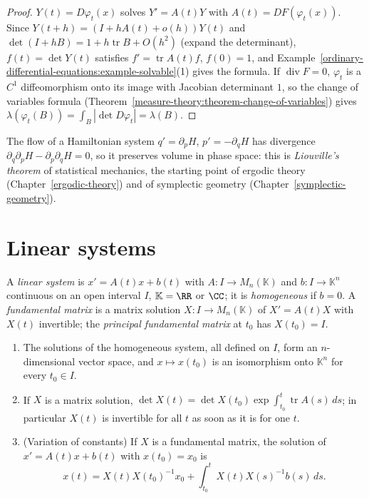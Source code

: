 \begin{proof}
$Y(t) = D\varphi_t(x)$ solves $Y' = A(t)Y$ with $A(t) = DF(\varphi_t(x))$. Since $Y(t + h) = (I + hA(t) + o(h))Y(t)$ and $\det(I + hB) = 1 + h\operatorname{tr}B + O(h^2)$ (expand the determinant), $f(t) = \det Y(t)$
satisfies $f' = \operatorname{tr}A(t)f$, $f(0) = 1$, and Example~\ref{ordinary-differential-equations:example-solvable}(1) gives the formula. If $\operatorname{div}F = 0$, $\varphi_t$ is a $C^1$ diffeomorphism onto its image with
Jacobian determinant $1$, so the change of variables formula (Theorem~\ref{measure-theory:theorem-change-of-variables}) gives $\lambda(\varphi_t(B)) = \int_B|\det D\varphi_t| = \lambda(B)$.
\end{proof}

The flow of a Hamiltonian system $q' = \partial_pH$, $p' = -\partial_qH$ has divergence $\partial_q\partial_pH - \partial_p\partial_qH = 0$, so it preserves volume in phase space: this is \emph{Liouville's theorem} of statistical mechanics,
the starting point of ergodic theory (Chapter~\ref{ergodic-theory}) and of symplectic geometry (Chapter~\ref{symplectic-geometry}).

\section{Linear systems}\label{ordinary-differential-equations:section-linear}

\begin{definition}\label{ordinary-differential-equations:definition-linear}
A \emph{linear system} is $x' = A(t)x + b(t)$ with $A \colon I \to M_n(\mathbb{K})$ and $b \colon I \to \mathbb{K}^n$ continuous on an open interval $I$, $\mathbb{K} = \RR$ or $\CC$; it is \emph{homogeneous} if $b = 0$. A
\emph{fundamental matrix} is a matrix solution $X \colon I \to M_n(\mathbb{K})$ of $X' = A(t)X$ with $X(t)$ invertible; the \emph{principal fundamental matrix} at $t_0$ has $X(t_0) = I$.
\end{definition}

\begin{proposition}\label{ordinary-differential-equations:proposition-linear-structure}
\begin{enumerate}
\item The solutions of the homogeneous system, all defined on $I$, form an $n$-dimensional vector space, and $x \mapsto x(t_0)$ is an isomorphism onto $\mathbb{K}^n$ for every $t_0 \in I$.
\item If $X$ is a matrix solution, $\det X(t) = \det X(t_0)\exp\int_{t_0}^t\operatorname{tr}A(s)\,ds$; in particular $X(t)$ is invertible for all $t$ as soon as it is for one $t$.
\item (Variation of constants) If $X$ is a fundamental matrix, the solution of $x' = A(t)x + b(t)$ with $x(t_0) = x_0$ is
\[
x(t) = X(t)X(t_0)^{-1}x_0 + \int_{t_0}^tX(t)X(s)^{-1}b(s)\,ds.
\]
\end{enumerate}
\end{proposition}


